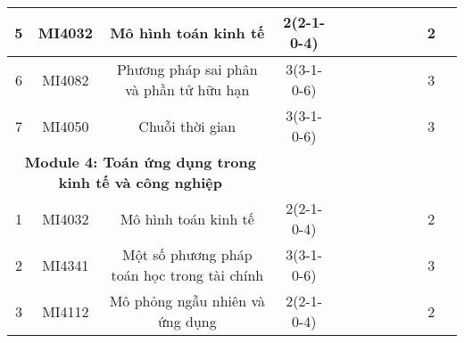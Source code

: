 \documentclass[12pt,a4paper]{report}
\begin{document}
\begin{landscape}
\begin{longtable}[c]{|c|c|c|c|c|c|c|c|c|c|c|c|}
        5                             & MI4032                          & Mô hình toán kinh tế                                         & 2(2-1-0-4)                                                                           &             &             &             &             &             &             & 2           &             \\ \hline
        6                             & MI4082                          & Phương pháp sai phân và phần tử hữu hạn                      & 3(3-1-0-6)                                                                           &             &             &             &             &             &             & 3           &             \\ \hline
        7                             & MI4050                          & Chuỗi thời gian                                              & 3(3-1-0-6)                                                                           &             &             &             &             &             &             & 3           &             \\ \hline
        \multicolumn{3}{|c|}{\textbf{Module 4: Toán ứng dụng trong kinh tế và công nghiệp}}                                            &                                                                                      &             &             &             &             &             &             &             &             \\ \hline
        1                             & MI4032                          & Mô hình toán kinh tế                                         & 2(2-1-0-4)                                                                           &             &             &             &             &             &             & 2           &             \\ \hline
        2                             & MI4341                          & Một số phương pháp toán học trong tài chính                  & 3(3-1-0-6)                                                                           &             &             &             &             &             &             & 3           &             \\ \hline
        3                             & MI4112                          & Mô phỏng ngẫu nhiên và ứng dụng                              & 2(2-1-0-4)                                                                           &             &             &             &             &             &             & 2           &             \\ \hline

\end{longtable}
\end{landscape}
\end{document}
